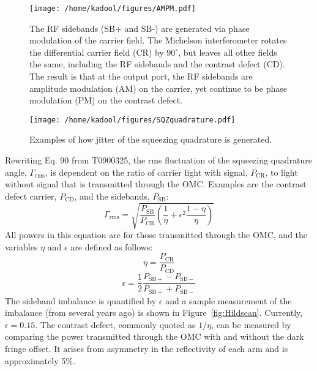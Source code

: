 \documentclass{ligodoc}
\begin{document}
\begin{figure}
\begin{centering}
\texttt{[image: /home/kadool/figures/AMPM.pdf]}
\caption{The RF sidebands (SB+ and SB-) are generated via phase
  modulation of the carrier field. The Michelson interferometer
  rotates the differential carrier field (CR) by $90^\circ$, but leaves
  all other fields the same, including the RF sidebands and the
  contrast defect (CD). The result is that at the output port, the RF
  sidebands are amplitude modulation (AM) on the carrier, yet continue
  to be phase modulation (PM) on the contrast defect.}
\label{fig:AMPM}
\end{centering}
\end{figure}

\begin{figure}
\begin{centering}
\texttt{[image: /home/kadool/figures/SQZquadrature.pdf]}
\caption{Examples of how jitter of the squeezing quadrature is
  generated.}
\label{fig:sqzquad}
\end{centering}
\end{figure}


Rewriting Eq. 90 from T0900325, the rms fluctuation of the squeezing
quadrature angle, $\Gamma_{\mathrm{rms}}$, is dependent on the ratio
of carrier light with signal, $P_{\mathrm{CR}}$, to light without
signal that is transmitted through the OMC. Examples are the contrast
defect carrier, $P_{\mathrm{CD}}$, and the sidebands, $P_{\mathrm{SB}}$:
\begin{equation}
\Gamma_{\mathrm{rms}} = \sqrt{\frac{P_{\mathrm{SB}}}{P_{\mathrm{CR}}} \left( \frac{1}{\eta} + \epsilon^2 \frac{1-\eta}{\eta} \right)}
\label{eq:Gammarms}
\end{equation}
All powers in this equation are for those transmitted through the OMC,
and the variables $\eta$ and $\epsilon$ are defined as follows:
\begin{equation}
\eta = \frac{P_{\mathrm{CR}}}{P_{\mathrm{CD}}}
\end{equation}
\begin{equation}
\epsilon = \frac{1}{2}\frac{P_{\mathrm{SB+}}-P_{\mathrm{SB-}}}{P_{\mathrm{SB+}}+P_{\mathrm{SB-}}}
\end{equation}
The sideband imbalance is quantified by $\epsilon$ and a sample
measurement of the imbalance (from several years ago) is shown in
Figure~\ref{fig:Hildscan}. Currently, $\epsilon=0.15$. The contrast
defect, commonly quoted as $1/\eta$, can be measured by comparing the
power transmitted through the OMC with and without the dark fringe
offset. It arises from asymmetry in the reflectivity of each arm and
is approximately 5\%.
\end{document}
